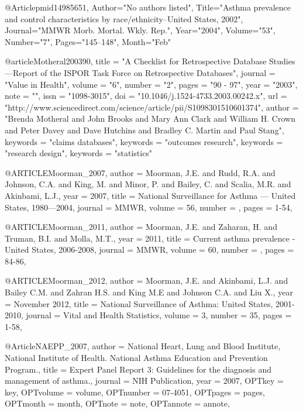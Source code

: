 {{{%
@Article{pmid14985651,
   Author="No authors listed",
   Title="{{A}sthma prevalence and control characteristics by race/ethnicity--{U}nited {S}tates, 2002}",
   Journal="MMWR Morb. Mortal. Wkly. Rep.",
   Year="2004",
   Volume="53",
   Number="7",
   Pages="145--148",
   Month="Feb"
}

@article{Motheral200390,
title = "A Checklist for Retrospective Database Studies—Report of the ISPOR Task Force on Retrospective Databases",
journal = "Value in Health",
volume = "6",
number = "2",
pages = "90 - 97",
year = "2003",
note = "",
issn = "1098-3015",
doi = "10.1046/j.1524-4733.2003.00242.x",
url = "http://www.sciencedirect.com/science/article/pii/S1098301510601374",
author = "Brenda Motheral and John Brooks and Mary Ann Clark and William H. Crown and Peter Davey and Dave Hutchins and Bradley C. Martin and Paul Stang",
keywords = "claims databases",
keywords = "outcomes research",
keywords = "research design",
keywords = "statistics"
}



@ARTICLE{Moorman_2007,
  author = {Moorman, J.E. and Rudd, R.A. and Johnson, C.A. and King, M. and Minor, P. and Bailey, C. and Scalia, M.R. and Akinbami, L.J.},
  year = {2007},
  title = {National Surveillance for Asthma --- United States, 1980—2004},
  journal = MMWR,
  volume =  {56},
  number = {},
  pages = {1-54},
}


@ARTICLE{Moorman_2011,
  author = {Moorman, J.E. and Zaharan, H. and Truman, B.I. and Molla, M.T.},
  year = {2011},
  title = {Current asthma prevalence - United States, 2006-2008},
  journal = MMWR,
  volume =  {60},
  number = {},
  pages = {84-86},
}

@ARTICLE{Moorman_2012,
  author = {Moorman, J.E. and Akinbami, L.J. and Bailey C.M. and Zahran H.S. and King M.E and Johnson C.A. and Liu X.},
  year = {November 2012},
  title = {National Surveillance of Asthma: United States, 2001-2010},
  journal = Vital and Health Statistics,
  volume =  {3},
  number = {35},
  pages = {1-58},
}



@Article{NAEPP_2007,
author = {National Heart, Lung and Blood Institute, National Institute of Health. National Asthma Education and Prevention Program.},
title = {Expert Panel Report 3: Guidelines for the diagnosis and management of asthma.},
journal = {NIH Publication},
year = {2007},
OPTkey = {key},
OPTvolume = {volume},
OPTnumber = {07-4051},
OPTpages = {pages},
OPTmonth = {month},
OPTnote = {note},
OPTannote = {annote},
}


}}}
